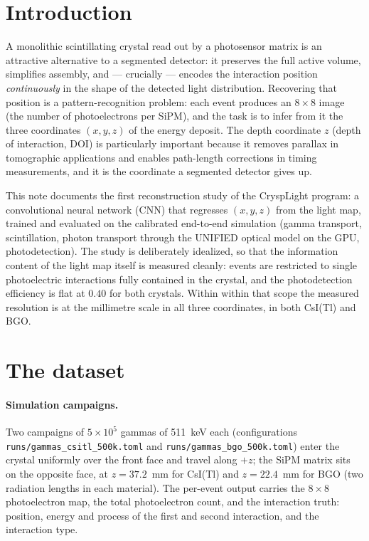 \documentclass[11pt,a4paper]{article}
\newcommand{\code}[1]{\texttt{#1}}
\newcommand{\csitl}{CsI(Tl)}
\begin{document}
\tableofcontents

\section{Introduction}

A monolithic scintillating crystal read out by a photosensor matrix is an
attractive alternative to a segmented detector: it preserves the full active
volume, simplifies assembly, and --- crucially --- encodes the interaction
position \emph{continuously} in the shape of the detected light distribution.
Recovering that position is a pattern-recognition problem: each event produces
an $8\times8$ image (the number of photoelectrons per SiPM), and the task is to
infer from it the three coordinates $(x, y, z)$ of the energy deposit. The
depth coordinate $z$ (depth of interaction, DOI) is particularly important because it removes
parallax in tomographic applications and enables path-length corrections in
timing measurements, and it is the coordinate a segmented detector gives up.

This note documents the first reconstruction study of the CryspLight program:
a convolutional neural network (CNN) that regresses $(x, y, z)$ from the light
map, trained and evaluated on the calibrated end-to-end simulation (gamma
transport, scintillation, photon transport through the UNIFIED optical model on
the GPU, photodetection). The study is deliberately idealized, so that the
information content of the light map itself is measured cleanly: events are
restricted to single photoelectric interactions fully contained in the crystal,
and the photodetection efficiency is flat at $0.40$ for both crystals. Within
within that scope the measured resolution is at the millimetre scale in all three
coordinates, in both \csitl{} and BGO.

\section{The dataset}
\label{sec:dataset}

\paragraph{Simulation campaigns.} Two campaigns of $5\times10^5$ gammas of
511~keV each (configurations \code{runs/gammas\_csitl\_500k.toml} and
\code{runs/gammas\_bgo\_500k.toml}) enter the crystal uniformly over the front
face and travel along $+z$; the SiPM matrix sits on the opposite face, at
$z = 37.2$~mm for \csitl{} and $z = 22.4$~mm for BGO (two radiation lengths in
each material). The per-event output carries the $8\times8$ photoelectron map,
the total photoelectron count, and the interaction truth: position, energy and
process of the first and second interaction, and the interaction type.
\end{document}

